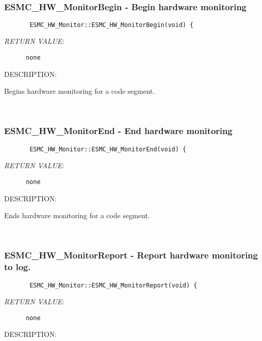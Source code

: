  
\mbox{}\hrulefill\ 
 
\subsubsection{ESMC\_HW\_MonitorBegin - Begin hardware monitoring}


  
\begin{verbatim}       ESMC_HW_Monitor::ESMC_HW_MonitorBegin(void) {\end{verbatim}{\em RETURN VALUE:}
\begin{verbatim}      none\end{verbatim}
{\sf DESCRIPTION:\\ }


        Begins hardware monitoring for a code segment.
   
 
\mbox{}\hrulefill\ 
 
\subsubsection{ESMC\_HW\_MonitorEnd - End hardware monitoring}


  
\begin{verbatim}       ESMC_HW_Monitor::ESMC_HW_MonitorEnd(void) {\end{verbatim}{\em RETURN VALUE:}
\begin{verbatim}      none\end{verbatim}
{\sf DESCRIPTION:\\ }


        Ends hardware monitoring for a code segment.
   
 
\mbox{}\hrulefill\ 
 
\subsubsection{ESMC\_HW\_MonitorReport - Report hardware monitoring to log.}


  
\begin{verbatim}       ESMC_HW_Monitor::ESMC_HW_MonitorReport(void) {\end{verbatim}{\em RETURN VALUE:}
\begin{verbatim}      none\end{verbatim}
{\sf DESCRIPTION:\\ }


